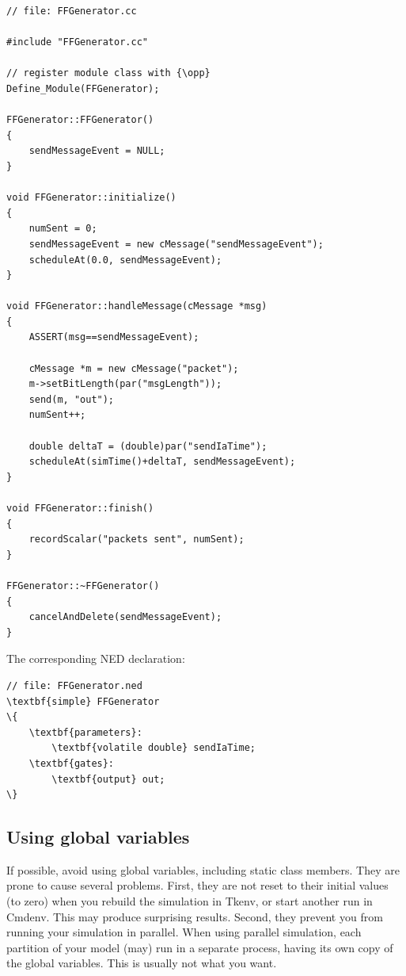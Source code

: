 \begin{verbatim}
// file: FFGenerator.cc

#include "FFGenerator.cc"

// register module class with {\opp}
Define_Module(FFGenerator);

FFGenerator::FFGenerator()
{
    sendMessageEvent = NULL;
}

void FFGenerator::initialize()
{
    numSent = 0;
    sendMessageEvent = new cMessage("sendMessageEvent");
    scheduleAt(0.0, sendMessageEvent);
}

void FFGenerator::handleMessage(cMessage *msg)
{
    ASSERT(msg==sendMessageEvent);

    cMessage *m = new cMessage("packet");
    m->setBitLength(par("msgLength"));
    send(m, "out");
    numSent++;

    double deltaT = (double)par("sendIaTime");
    scheduleAt(simTime()+deltaT, sendMessageEvent);
}

void FFGenerator::finish()
{
    recordScalar("packets sent", numSent);
}

FFGenerator::~FFGenerator()
{
    cancelAndDelete(sendMessageEvent);
}
\end{verbatim}

The corresponding NED declaration:

\begin{Verbatim}[commandchars=\\\{\}]
// file: FFGenerator.ned
\textbf{simple} FFGenerator
\{
    \textbf{parameters}:
        \textbf{volatile double} sendIaTime;
    \textbf{gates}:
        \textbf{output} out;
\}
\end{Verbatim}




\subsection{Using global variables}

If possible, avoid using global variables, including
static class members. They are prone to cause several problems.
First, they are not reset to their initial values (to zero)
when you rebuild the simulation in Tkenv, or start another run
in Cmdenv. This may produce surprising results.
Second, they prevent you from running your simulation in parallel.
When using parallel simulation, each partition of your model
(may) run in a separate process, having its own copy of the
global variables. This is usually not what you want.

